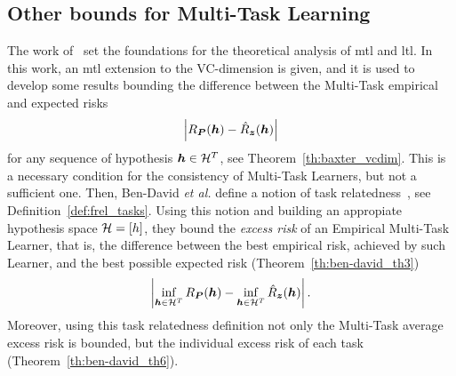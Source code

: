 \subsection{Other bounds for Multi-Task Learning}
The work of~\cite{baxter2000model} set the foundations for the theoretical analysis of \acrshort{mtl} and \acrshort{ltl}. 
In this work, an \acrshort{mtl} extension to the VC-dimension is given, and it is used to develop some results bounding the difference between the Multi-Task empirical and expected risks 
\begin{equation}
    \nonumber
    \left|R_{\bm{P}}(\bm{h}) - \hat{R}_{\bm{z}}(\bm{h})\right|
\end{equation}
for any sequence of hypothesis $\bm{h} \in \mathcal{H}^T$, see Theorem~\ref{th:baxter_vcdim}. This is a necessary condition for the consistency of Multi-Task Learners, but not a sufficient one.
Then, Ben-David \emph{et al.} define a notion of task relatedness~\citep{Ben-DavidS03,Ben-DavidB08}, see Definition~\ref{def:frel_tasks}. Using this notion and building an appropiate hypothesis space $\mathcal{H} = \lbrack h\rbrack$, they bound the \emph{excess risk} of an Empirical Multi-Task Learner, that is, the difference between the best empirical risk, achieved by such Learner, and the best possible expected risk (Theorem~\ref{th:ben-david_th3})
\begin{equation}
    \nonumber
    \left|\inf_{\bm{h} \in \mathcal{H}^T} R_{\bm{P}}(\bm{h}) - \inf_{\bm{h} \in \mathcal{H}^T} \hat{R}_{\bm{z}}(\bm{h})\right| .
\end{equation}
Moreover, using this task relatedness definition not only the Multi-Task average excess risk is bounded, but the individual excess risk of each task (Theorem~\ref{th:ben-david_th6}).

